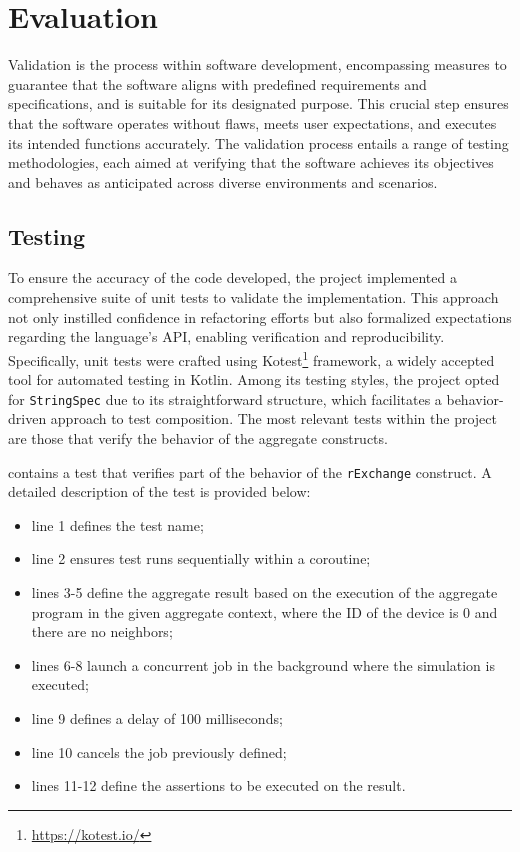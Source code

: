 
\chapter{Evaluation}
\label{chap:evaluation}

Validation is the process within software development, encompassing measures to guarantee that the software aligns with predefined requirements and specifications, and is suitable for its designated purpose. This crucial step ensures that the software operates without flaws, meets user expectations, and executes its intended functions accurately. The validation process entails a range of testing methodologies, each aimed at verifying that the software achieves its objectives and behaves as anticipated across diverse environments and scenarios.

\section{Testing}

To ensure the accuracy of the code developed, the project implemented a comprehensive suite of unit tests to validate the implementation. This approach not only instilled confidence in refactoring efforts but also formalized expectations regarding the language's API, enabling verification and reproducibility. Specifically, unit tests were crafted using Kotest\footnote{\url{https://kotest.io/}} framework, a widely accepted tool for automated testing in Kotlin. Among its testing styles, the project opted for \texttt{StringSpec} due to its straightforward structure, which facilitates a behavior-driven approach to test composition. The most relevant tests within the project are those that verify the behavior of the aggregate constructs.

 contains a test that verifies part of the behavior of the \texttt{rExchange} construct. A detailed description of the test is provided below:

\begin{itemize}
    \item line 1 defines the test name;
    \item line 2 ensures test runs sequentially within a coroutine;
    \item lines 3-5 define the aggregate result based on the execution of the aggregate program in the given aggregate context, where the ID of the device is 0 and there are no neighbors;
    \item lines 6-8 launch a concurrent job in the background where the simulation is executed;
    \item line 9 defines a delay of 100 milliseconds;
    \item line 10 cancels the job previously defined;
    \item lines 11-12 define the assertions to be executed on the result.
\end{itemize}

